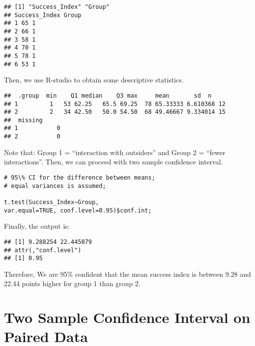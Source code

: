 \begin{tcolorbox}[colback=gray!10, colframe=gray!50, arc=2mm]
\begin{verbatim}
## [1] "Success_Index" "Group" 
## Success_Index Group 
## 1 65 1 
## 2 66 1 
## 3 58 1 
## 4 70 1 
## 5 78 1 
## 6 53 1
\end{verbatim}
\end{tcolorbox}

Then, we use R-studio to obtain some descriptive statistics.

\begin{tcolorbox}[colback=gray!10, colframe=gray!50, arc=2mm]
\begin{verbatim}
##	.group  min    Q1 median    Q3 max     mean       sd  n
## 1 		 1   53 62.25   65.5 69.25  78 65.33333 6.610368 12
## 2 		 2   34 42.50   50.0 54.50  68 49.46667 9.334014 15
## 	missing
## 1 		   0
## 2 		   0
\end{verbatim}
\end{tcolorbox}

Note that: Group 1 = “interaction with outsiders” and Group 2 = “fewer interactions”. Then, we can proceed with two sample confidence interval.

\begin{tcolorbox}[colback=gray!10, colframe=gray!50, arc=2mm]
\begin{verbatim}
# 95\% CI for the difference between means; 
# equal variances is assumed;

t.test(Success_Index~Group, 
var.equal=TRUE, conf.level=0.95)$conf.int;
\end{verbatim}
\end{tcolorbox}

Finally, the output is:

\begin{tcolorbox}[colback=gray!10, colframe=gray!50, arc=2mm]
\begin{verbatim}
## [1] 9.288254 22.445079 
## attr(,"conf.level") 
## [1] 0.95
\end{verbatim}
\end{tcolorbox}

Therefore, We are 95\% conﬁdent that the mean success index is between 9.28 and 22.44 points higher for group 1 than group 2.

\section{Two Sample Confidence Interval on Paired Data}

